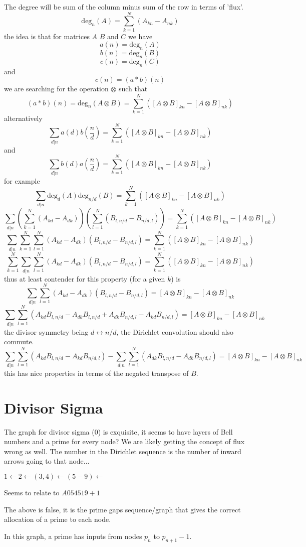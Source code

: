 \documentclass{article}
\begin{document}
The degree will be sum of the column minus sum of the row in terms of 'flux'.
$$
\mathrm{deg}_n(A) = \sum_{k=1}^N (A_{kn}-A_{nk})
$$
the idea is that for matrices $A$ $B$ and $C$ we have 
$$
a(n) = \mathrm{deg}_n(A)
$$
$$
b(n) = \mathrm{deg}_n(B)
$$
$$
c(n) = \mathrm{deg}_n(C)
$$
and 
$$
c(n) = (a * b)(n)
$$
we are searching for the operation $\otimes$ such that
$$
(a * b)(n) = \mathrm{deg}_n(A \otimes B) = \sum_{k=1}^N ([A \otimes B]_{kn}-[A \otimes B]_{nk})
$$
alternatively
$$
\sum_{d|n}a(d)b\left(\frac{n}{d}\right) = \sum_{k=1}^N ([A \otimes B]_{kn}-[A \otimes B]_{nk})
$$
and
$$
\sum_{d|n}b(d)a\left(\frac{n}{d}\right) = \sum_{k=1}^N ([A \otimes B]_{kn}-[A \otimes B]_{nk})
$$
for example
$$
\sum_{d|n}\mathrm{deg}_d(A)\mathrm{deg}_{n/d}(B) = \sum_{k=1}^N ([A \otimes B]_{kn}-[A \otimes B]_{nk})
$$
$$
\sum_{d|n}\left(\sum_{k=1}^N (A_{kd}-A_{dk})\right)\left(\sum_{l=1}^N (B_{l,n/d}-B_{n/d,l})\right) = \sum_{k=1}^N ([A \otimes B]_{kn}-[A \otimes B]_{nk})
$$
$$
\sum_{d|n}\sum_{k=1}^N \sum_{l=1}^N  (A_{kd}-A_{dk})(B_{l,n/d}-B_{n/d,l}) = \sum_{k=1}^N ([A \otimes B]_{kn}-[A \otimes B]_{nk})
$$
$$
\sum_{k=1}^N \sum_{d|n} \sum_{l=1}^N  (A_{kd}-A_{dk})(B_{l,n/d}-B_{n/d,l}) = \sum_{k=1}^N ([A \otimes B]_{kn}-[A \otimes B]_{nk})
$$
thus at least contender for this property (for a given $k$) is
$$
\sum_{d|n} \sum_{l=1}^N  (A_{kd}-A_{dk})(B_{l,n/d}-B_{n/d,l}) = [A \otimes B]_{kn}-[A \otimes B]_{nk}
$$
$$
\sum_{d|n} \sum_{l=1}^N  (A_{kd}B_{l,n/d}-A_{dk}B_{l,n/d} + A_{dk}B_{n/d,l}-A_{kd}B_{n/d,l}) = [A \otimes B]_{kn}-[A \otimes B]_{nk}
$$
the divisor symmetry being $d \leftrightarrow n/d$, the Dirichlet convolution should also commute.
$$
\sum_{d|n} \sum_{l=1}^N  (A_{kd}B_{l,n/d} -A_{kd}B_{n/d,l} ) - \sum_{d|n} \sum_{l=1}^N (A_{dk}B_{l,n/d} - A_{dk}B_{n/d,l}) = [A \otimes B]_{kn}-[A \otimes B]_{nk}
$$
this has nice properties in terms of the negated transpose of $B$.

\section{Divisor Sigma}
The graph for divisor sigma (0) is exquisite, it seems to have layers of Bell numbers and a prime for every node?
We are likely getting the concept of flux wrong as well. The number in the Dirichlet sequence is the number of inward arrows going to that node... 

$1 \leftarrow 2 \leftarrow (3,4) \leftarrow (5-9) \leftarrow $

Seems to relate to $A054519 + 1$

The above is false, it is the prime gaps sequence/graph that gives the correct allocation of a prime to each node.


In this graph, a prime has inputs from nodes $p_n$ to $p_{n+1}-1$.



{}

\end{document}
